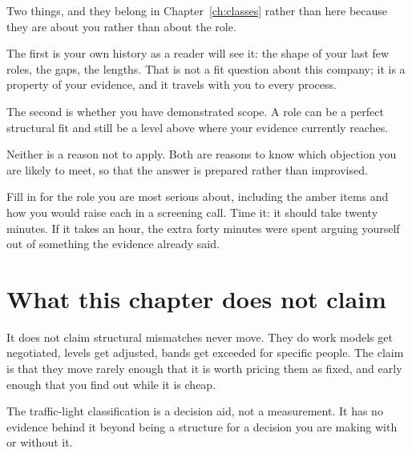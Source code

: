Two things, and they belong in Chapter~\ref{ch:classes} rather than here
because they are about you rather than about the role.

The first is your own history as a reader will see it: the shape of your last
few roles, the gaps, the lengths. That is not a fit question about this
company; it is a property of your evidence, and it travels with you to every
process.

The second is whether you have demonstrated scope. A role can be a perfect
structural fit and still be a level above where your evidence currently
reaches.

Neither is a reason not to apply. Both are reasons to know which objection you
are likely to meet, so that the answer is prepared rather than improvised.

\begin{drill}
Fill in  for the role you are most serious about,
including the amber items and how you would raise each in a screening call.
Time it: it should take twenty minutes. If it takes an hour, the extra forty
minutes were spent arguing yourself out of something the evidence already said.
\end{drill}

\section*{What this chapter does not claim}

It does not claim structural mismatches never move. They do \dash{} work models
get negotiated, levels get adjusted, bands get exceeded for specific people.
The claim is that they move rarely enough that it is worth pricing them as
fixed, and early enough that you find out while it is cheap.

The traffic-light classification is a decision aid, not a measurement. It has
no evidence behind it beyond being a structure for a decision you are making
with or without it.
